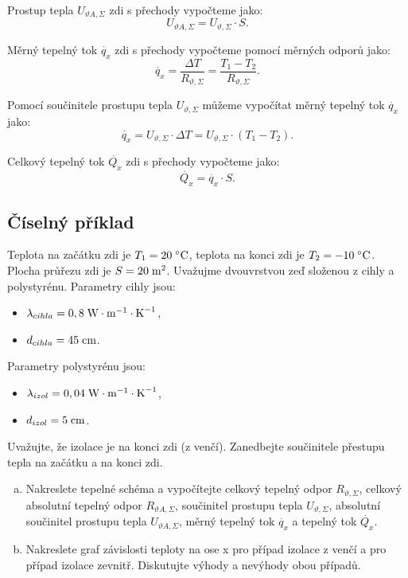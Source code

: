 \documentclass{article}
\begin{document}
Prostup tepla $U_{\vartheta A,\Sigma}$ zdi s přechody vypočteme jako:
$$
    U_{\vartheta A,\Sigma} = U_{\vartheta,\Sigma} \cdot S.
$$

Měrný tepelný tok $\dot{q_x}$ zdi s přechody vypočteme pomocí měrných odporů jako:
$$
    \dot{q_x} = \frac{\Delta T}{R_{\vartheta,\Sigma}} = \frac{T_1 - T_2}{R_{\vartheta,\Sigma}}.
$$

Pomocí součinitele prostupu tepla $U_{\vartheta,\Sigma}$ můžeme vypočítat měrný tepelný tok $\dot{q_x}$ jako:
$$
    \dot{q_x} = U_{\vartheta,\Sigma} \cdot \Delta T = U_{\vartheta,\Sigma} \cdot (T_1 - T_2).
$$

Celkový tepelný tok $\dot{Q_x}$ zdi s přechody vypočteme jako:
$$
    \dot{Q_x} = \dot{q_x} \cdot S.
$$



\subsection{Číselný příklad}
Teplota na začátku zdi je $T_1 = 20 \; ^\circ \textrm{C}$, teplota na konci zdi je $T_2 = -10 \; ^\circ \textrm{C}$. Plocha průřezu zdi je $S = 20 \; \textrm{m}^{\textrm{2}}$. Uvažujme dvouvrstvou zeď složenou z cihly a polystyrénu. Parametry cihly jsou:
\begin{itemize}
    \item $\lambda_{cihla} = 0,8 \; \textrm{W} \cdot \textrm{m}^{-1} \cdot \textrm{K}^{-1}$,
    \item $d_{cihla} = 45 \; \textrm{cm}$.
\end{itemize}

Parametry polystyrénu jsou:
\begin{itemize}
    \item $\lambda_{izol} = 0,04 \; \textrm{W} \cdot \textrm{m}^{-1} \cdot \textrm{K}^{-1}$,
    \item $d_{izol} = 5 \; \textrm{cm}$.
\end{itemize}

Uvažujte, že izolace je na konci zdi (z venčí). Zanedbejte součinitele přestupu tepla na začátku a na konci zdi.
\begin{enumerate}[a)]
    \item Nakreslete tepelné schéma a vypočítejte celkový tepelný odpor $R_{\vartheta,\Sigma}$, celkový absolutní tepelný odpor $R_{\vartheta A,\Sigma}$, součinitel prostupu tepla $U_{\vartheta,\Sigma}$, absolutní součinitel prostupu tepla $U_{\vartheta A,\Sigma}$, měrný tepelný tok $\dot{q_x}$ a tepelný tok $\dot{Q_x}$.
    \item Nakreslete graf závislosti teploty na ose x pro případ izolace z venčí a pro případ izolace zevnitř. Diskutujte výhody a nevýhody obou případů.
\end{enumerate}
\end{document}
